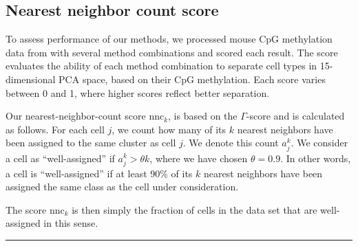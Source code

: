 \documentclass[twocolumn,10pt]{article}
\begin{document}
\subsection{Nearest neighbor count score}
To assess performance of our methods, we processed mouse CpG methylation data from \citet{luo2017single} with several method combinations and scored each result. The score evaluates the ability of each method combination to separate cell types in 15-dimensional PCA space, based on their CpG methylation. Each score varies between 0 and 1, where higher scores reflect better separation.

Our nearest-neighbor-count score $\text{nnc}_k$, is based on the $\Gamma$-score \citep{Kireeva_2014} and is calculated as follows. For each cell $j$, we count how many of its $k$ nearest neighbors have been assigned to the same cluster as cell $j$. We denote this count $a^k_j$. We consider a cell as ``well-assigned'' if $a^k_j>\theta k$, where we have chosen $\theta=0.9$. In other words, a cell is ``well-assigned'' if at least 90\% of its $k$ nearest neighbors have been assigned the same class as the cell under consideration.

The score $\text{nnc}_k$ is then simply the fraction of cells in the data set that are well-assigned in this sense.

\vspace{1.6ex}
\noindent\hfil\rule{.6\columnwidth}{.2pt}\hfil


{\small }
\end{document}
